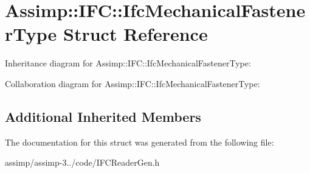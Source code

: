 \hypertarget{struct_assimp_1_1_i_f_c_1_1_ifc_mechanical_fastener_type}{\section{Assimp\+:\+:I\+F\+C\+:\+:Ifc\+Mechanical\+Fastener\+Type Struct Reference}
\label{struct_assimp_1_1_i_f_c_1_1_ifc_mechanical_fastener_type}
}


Inheritance diagram for Assimp\+:\+:I\+F\+C\+:\+:Ifc\+Mechanical\+Fastener\+Type\+:


Collaboration diagram for Assimp\+:\+:I\+F\+C\+:\+:Ifc\+Mechanical\+Fastener\+Type\+:
\subsection*{Additional Inherited Members}


The documentation for this struct was generated from the following file\+:\begin{DoxyCompactItemize}
\item 
assimp/assimp-\/3../code/I\+F\+C\+Reader\+Gen.\+h\end{DoxyCompactItemize}
